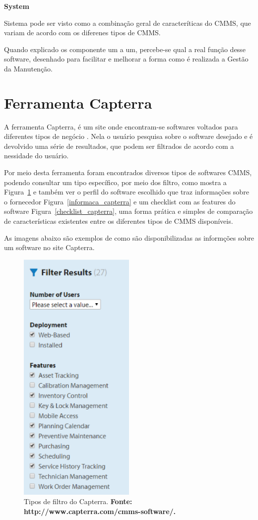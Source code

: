 \textbf{System}

Sistema pode ser visto como a combinação geral de caracteríticas do CMMS, que variam de acordo com os diferenes tipos de CMMS.

Quando explicado os componente um a um, percebe-se qual a real função desse software, desenhado para facilitar e melhorar a forma como é realizada a Gestão da Manutenção. 

\section{Ferramenta Capterra}

A ferramenta Capterra, é um site onde encontram-se softwares voltados para diferentes tipos de negócio \cite{capterra}. Nela o usuário pesquisa sobre o software desejado e é devolvido uma série de resultados, que podem ser filtrados de acordo com a nessidade do usuário.

Por meio desta ferramenta foram encontrados diversos tipos de softwares CMMS, podendo consultar um tipo específico, por meio dos filtro, como mostra a Figura~\ref{filtro_capterra} e também ver o perfil do software escolhido que traz informações sobre o fornecedor Figura~\ref{informaca_capterra} e um checklist com as features do software Figura~\ref{checklist_capterra}, uma forma prática e simples de comparação de características existentes entre os diferentes tipos de CMMS disponíveis.

As imagens abaixo são exemplos de como são disponibilizadas as informções sobre um software no site Capterra.

\graphicspath{{figuras/}}
\begin{figure}[h]
\centering
\includegraphics[width=0.5\textwidth]{filtro_capterra.eps}
\caption{Tipos de filtro do Capterra. \textbf{Fonte: http://www.capterra.com/cmms-software/.}}
\label{filtro_capterra}
\end{figure}


